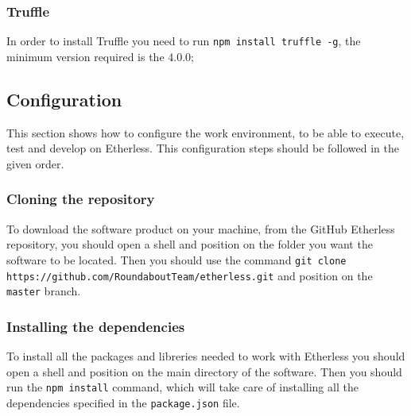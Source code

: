 \subsubsection{Truffle}
 In order to install Truffle you need to run \texttt{npm install truffle -g}, the minimum version required is the 4.0.0;
\subsection{Configuration}
This section shows how to configure the work environment, to be able to execute, test and develop on Etherless. This configuration steps should be followed in the given order.
\subsubsection{Cloning the repository}
To download the software product on your machine, from the GitHub Etherless repository, you should open a shell and position on the folder you want the software to be located. Then you should use the command \texttt{git clone https://github.com/RoundaboutTeam/etherless.git} and position on the \texttt{master} branch.
\subsubsection{Installing the dependencies}
To install all the packages and libreries needed to work with Etherless you should open a shell and position on the main directory of the software. Then you should run the \texttt{npm install} command, which will take care of installing all the dependencies specified in the \texttt{package.json} file.
